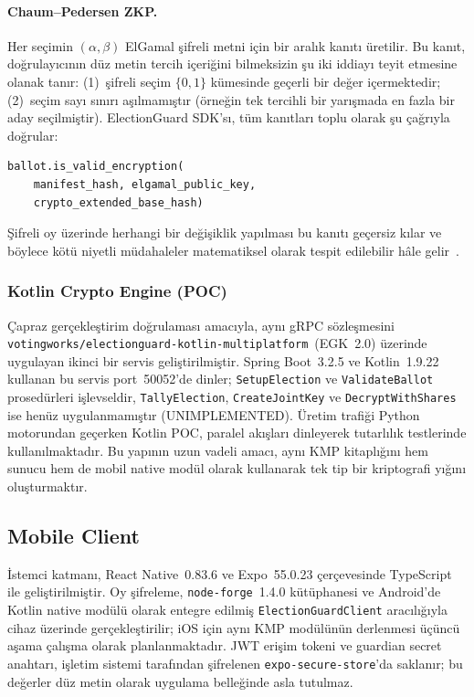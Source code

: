 \documentclass[a4paper,fleqn]{cas-sc}
\begin{document}
\paragraph{Chaum--Pedersen ZKP.}
Her seçimin $(\alpha, \beta)$ ElGamal şifreli metni için bir aralık
kanıtı üretilir.
Bu kanıt, doğrulayıcının düz metin tercih içeriğini bilmeksizin şu iki
iddiayı teyit etmesine olanak tanır: (1)~şifreli seçim $\{0, 1\}$
kümesinde geçerli bir değer içermektedir; (2)~seçim sayı sınırı
aşılmamıştır (örneğin tek tercihli bir yarışmada en fazla bir aday
seçilmiştir).
ElectionGuard SDK'sı, tüm kanıtları toplu olarak şu çağrıyla doğrular:

\begin{verbatim}
ballot.is_valid_encryption(
    manifest_hash, elgamal_public_key,
    crypto_extended_base_hash)
\end{verbatim}

Şifreli oy üzerinde herhangi bir değişiklik yapılması bu kanıtı geçersiz
kılar ve böylece kötü niyetli müdahaleler matematiksel olarak tespit
edilebilir hâle gelir~\cite{EGSpec2024}.


\subsubsection{Kotlin Crypto Engine (POC)}

Çapraz gerçekleştirim doğrulaması amacıyla, aynı gRPC sözleşmesini
\texttt{votingworks/electionguard-kotlin-multiplatform}~(EGK~2.0)
üzerinde uygulayan ikinci bir servis geliştirilmiştir.
Spring Boot~3.2.5 ve Kotlin~1.9.22 kullanan bu servis port~50052'de
dinler; \texttt{SetupElection} ve \texttt{ValidateBallot} prosedürleri
işlevseldir, \texttt{TallyElection}, \texttt{CreateJointKey} ve
\texttt{DecryptWithShares} ise henüz uygulanmamıştır (UNIMPLEMENTED).
Üretim trafiği Python motorundan geçerken Kotlin POC, paralel akışları
dinleyerek tutarlılık testlerinde kullanılmaktadır.
Bu yapının uzun vadeli amacı, aynı KMP kitaplığını hem sunucu hem de
mobil native modül olarak kullanarak tek tip bir kriptografi yığını
oluşturmaktır.

\subsection{Mobile Client}
\label{subsec:mobileclient}

İstemci katmanı, React Native~0.83.6 ve Expo~55.0.23 çerçevesinde
TypeScript ile geliştirilmiştir.
Oy şifreleme, \texttt{node-forge}~1.4.0 kütüphanesi ve Android'de
Kotlin native modülü olarak entegre edilmiş \texttt{ElectionGuardClient}
aracılığıyla cihaz üzerinde gerçekleştirilir; iOS için aynı KMP
modülünün derlenmesi üçüncü aşama çalışma olarak planlanmaktadır.
JWT erişim tokeni ve guardian secret anahtarı, işletim sistemi tarafından
şifrelenen \texttt{expo-secure-store}'da saklanır; bu değerler düz metin
olarak uygulama belleğinde asla tutulmaz.
\end{document}
